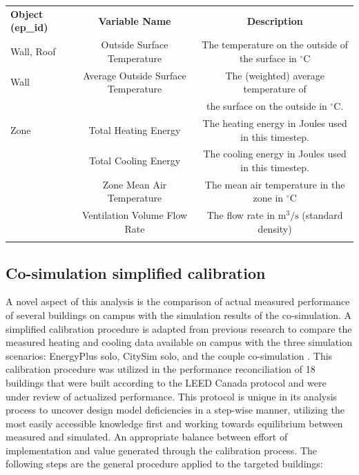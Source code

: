 \documentclass{tBPS2e}
\theoremstyle{plain}
\theoremstyle{definition}
\theoremstyle{remark}
\begin{document}
\begin{table}
{\begin{tabular}[l]{@{}lcc}\toprule
  \bf{Object (ep\_id)} &  \bf{Variable Name} & \bf{Description} \\
\colrule
Wall, Roof & Outside Surface Temperature & The temperature on the outside of the surface in $^{\circ}\mathrm{C}$ \\    
    \hline
Wall & Average Outside Surface Temperature & The (weighted) average temperature of \\
& & the surface on the outside in $^{\circ}\mathrm{C}$. \\
    \hline
Zone & Total Heating Energy & The heating energy in Joules used in this timestep. \\
& Total Cooling Energy & The cooling energy in Joules used in this timestep. \\
& Zone Mean Air Temperature & The mean air temperature in the zone in $^{\circ}\mathrm{C}$ \\
& Ventilation Volume Flow Rate & The flow rate in $\mathrm{m}^3/\mathrm{s}$ (standard density) \\
\botrule
\end{tabular}}
\label{FMUexports}
\end{table}

\subsection{Co-simulation simplified calibration}
A novel aspect of this analysis is the comparison of actual measured performance of several buildings on campus with the simulation results of the co-simulation. A simplified calibration procedure is adapted from previous research to compare the measured heating and cooling data available on campus with the three simulation scenarios: EnergyPlus solo, CitySim solo, and the couple co-simulation \citep{Samuelson:2015jg}. This calibration procedure was utilized in the performance reconciliation of 18 buildings that were built according to the LEED Canada protocol and were under review of actualized performance. This protocol is unique in its analysis process to uncover design model deficiencies in a step-wise manner, utilizing the most easily accessible knowledge first and working towards equilibrium between measured and simulated. An appropriate balance between effort of implementation and value generated through the calibration process. The following steps are the general procedure applied to the targeted buildings:
\end{document}
